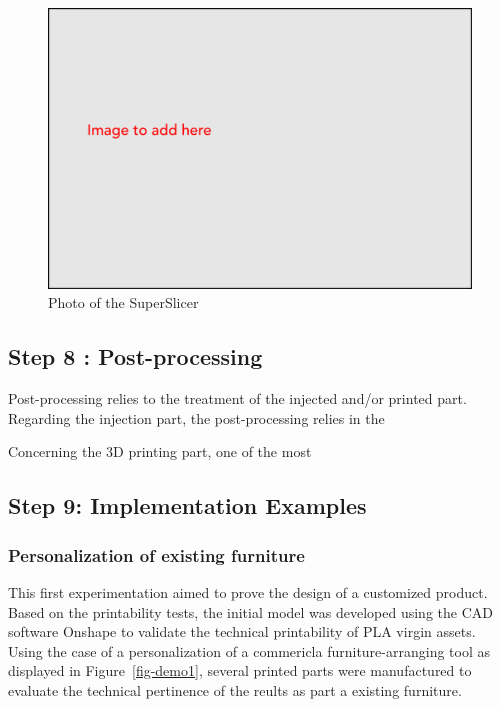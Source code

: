 \documentclass[
  11pt,
]{article}
\begin{document}
\begin{figure}[H]

{\centering \includegraphics[width=5.20833in,height=\textheight]{figures/Image-to-add.png}

}

\caption{Photo of the SuperSlicer}

\end{figure}

\hypertarget{step-8-post-processing}{%
\subsection{Step 8 : Post-processing}\label{step-8-post-processing}}

Post-processing relies to the treatment of the injected and/or printed
part. Regarding the injection part, the post-processing relies in the

Concerning the 3D printing part, one of the most

\hypertarget{step-9-implementation-examples}{%
\subsection{Step 9: Implementation
Examples}\label{step-9-implementation-examples}}

\hypertarget{personalization-of-existing-furniture}{%
\subsubsection{Personalization of existing
furniture}\label{personalization-of-existing-furniture}}

This first experimentation aimed to prove the design of a customized
product. Based on the printability tests, the initial model was
developed using the CAD software Onshape to validate the technical
printability of PLA virgin assets. Using the case of a personalization
of a commericla furniture-arranging tool as displayed in
Figure~\ref{fig-demo1}, several printed parts were manufactured to
evaluate the technical pertinence of the reults as part a existing
furniture.
\end{document}
